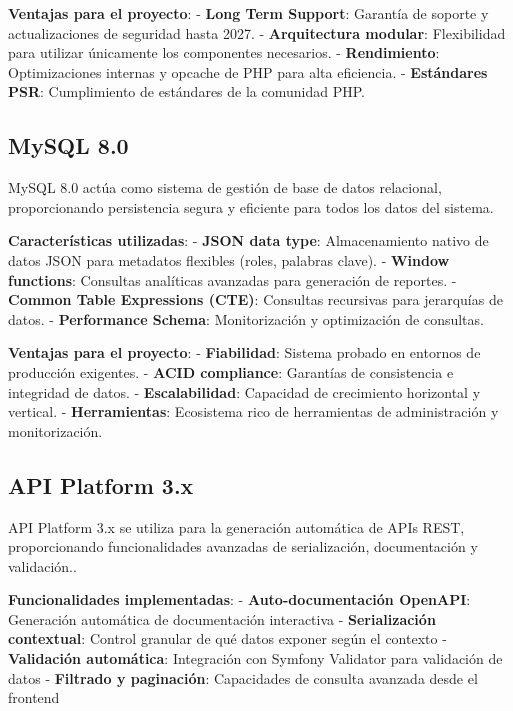 \documentclass[12pt,a4paper,oneside]{report}
\begin{document}
\textbf{Ventajas para el proyecto}: - \textbf{Long Term Support}:
Garantía de soporte y actualizaciones de seguridad hasta 2027. -
\textbf{Arquitectura modular}: Flexibilidad para utilizar únicamente los
componentes necesarios. - \textbf{Rendimiento}: Optimizaciones internas
y opcache de PHP para alta eficiencia. - \textbf{Estándares PSR}:
Cumplimiento de estándares de la comunidad PHP.

\subsection{MySQL 8.0}\label{mysql-8.0}

MySQL 8.0 actúa como sistema de gestión de base de datos relacional,
proporcionando persistencia segura y eficiente para todos los datos del
sistema.

\textbf{Características utilizadas}: - \textbf{JSON data type}:
Almacenamiento nativo de datos JSON para metadatos flexibles (roles,
palabras clave). - \textbf{Window functions}: Consultas analíticas
avanzadas para generación de reportes. - \textbf{Common Table
Expressions (CTE)}: Consultas recursivas para jerarquías de datos. -
\textbf{Performance Schema}: Monitorización y optimización de consultas.

\textbf{Ventajas para el proyecto}: - \textbf{Fiabilidad}: Sistema
probado en entornos de producción exigentes. - \textbf{ACID compliance}:
Garantías de consistencia e integridad de datos. -
\textbf{Escalabilidad}: Capacidad de crecimiento horizontal y vertical.
- \textbf{Herramientas}: Ecosistema rico de herramientas de
administración y monitorización.

\subsection{API Platform 3.x}\label{api-platform-3.x}

API Platform 3.x se utiliza para la generación automática de APIs REST,
proporcionando funcionalidades avanzadas de serialización, documentación
y validación..

\textbf{Funcionalidades implementadas}: - \textbf{Auto-documentación
OpenAPI}: Generación automática de documentación interactiva -
\textbf{Serialización contextual}: Control granular de qué datos exponer
según el contexto - \textbf{Validación automática}: Integración con
Symfony Validator para validación de datos - \textbf{Filtrado y
paginación}: Capacidades de consulta avanzada desde el frontend
\end{document}
